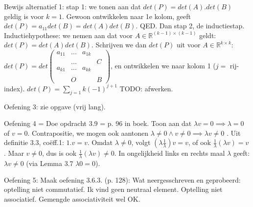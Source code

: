 \documentclass{article}
\begin{document}
Bewijs alternatief 1: stap 1: we tonen aan dat $det(P)=det(A).det(B)$ geldig is voor $k=1$. Gewoon ontwikkelen naar 1e kolom, geeft $det(P)=a_{11}det(B)= det(A)det(B)$. QED. 
Dan stap 2, de inductiestap. Inductiehypothese: we nemen aan dat voor $A \in \mathbb{R}^{(k-1)\times (k-1)}$ geldt: $det(P) = det(A)det(B)$. Schrijven we dan $det(P)$ uit voor $A \in \mathbb{R}^{k\times k}$: $det(P) = det 
\begin{pmatrix}
a_{11} & ... & a_{1k}  &  \\
       & ... &   &  C \\
a_{k1} & ... & a_{kk}  & \\
       &   &         &   \\ 
       & O   &         & B 
\end{pmatrix}$, en ontwikkelen we naar kolom 1 ($j = $ rij-index). 
$det(P) = \sum_{j=1}{k} (-1)^{j+1} $
TODO: afwerken. 

Oefening 3: zie opgave (vrij lang). 

Oefening 4 = Doe opdracht 3.9 = p. 96 in boek. Toon aan dat $\lambda v = 0 \implies \lambda = 0$ of $v=0$. Contrapositie, we mogen ook aantonen $\lambda \neq 0 \land v \neq 0 \implies  \lambda v \neq 0$ . Uit definitie 3.3, co\"eff.1: $1.v = v$. Omdat $\lambda \neq 0$, volgt $ (\lambda \frac{1}{\lambda}) v = v$, of ook $  \frac{1}{\lambda} ( \lambda v ) = v$. Maar $v \neq 0$, dus is ook $  \frac{1}{\lambda} ( \lambda v ) \neq 0 $. In ongelijkheid links en rechts maal $\lambda$ geeft: $ \lambda v \neq 0$ (via Lemma 3.7 $\lambda 0 = 0$). 

Oefening 5: Maak oefening 3.6.3. (p. 128): Wat neergesschreven en geprobeerd: optelling niet commutatief. Ik vind geen neutraal element. Optelling niet associatief. Gemengde associativiteit wel OK.  
\end{document}
